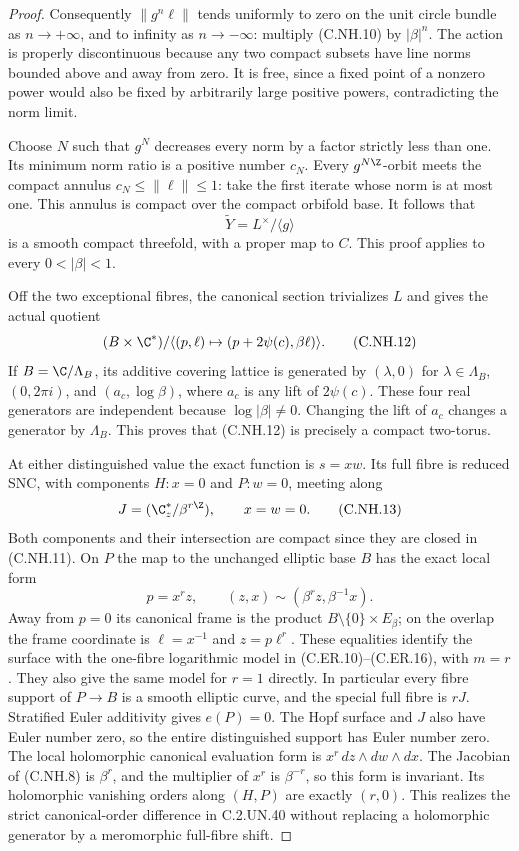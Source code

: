 \begin{proof}
Consequently $\|g^n\ell\|$ tends uniformly to zero on the
unit circle bundle as $n\to+\infty$, and to infinity as
$n\to-\infty$: multiply (C.NH.10) by $|\beta|^n$.
The action is properly discontinuous because any two
compact subsets have line norms bounded above and away
from zero. It is free, since a fixed point of a nonzero
power would also be fixed by arbitrarily large positive
powers, contradicting the norm limit.

Choose $N$ such that $g^N$ decreases every norm by a factor
strictly less than one. Its minimum norm ratio is a positive
number $c_N$. Every $g^{N\Z}$-orbit meets the compact annulus
$c_N\le\|\ell\|\le1$: take the first iterate whose norm is
at most one. This annulus is compact over the compact
orbifold base. It follows that
\[
                 \widetilde Y=L^\times/\langle g\rangle
                                                        \tag{C.NH.11}
\]
is a smooth compact threefold, with a proper map to $C$.
This proof applies to every $0<|\beta|<1$.

Off the two exceptional fibres, the canonical section
trivializes $L$ and gives the actual quotient
\[
 (B\times\C^*)/
   \langle(p,\ell)\mapsto(p+2\psi(c),\beta\ell)\rangle.
                                                        \tag{C.NH.12}
\]
If $B=\C/\Lambda_B$, its additive covering lattice is
generated by $(\lambda,0)$ for $\lambda\in\Lambda_B$,
$(0,2\pi i)$, and $(a_c,\log\beta)$, where $a_c$ is any
lift of $2\psi(c)$. These four real generators are
independent because $\log|\beta|\ne0$. Changing the lift
of $a_c$ changes a generator by $\Lambda_B$. This proves
that (C.NH.12) is precisely a compact two-torus.

At either distinguished value the exact function is
$s=xw$. Its full fibre is reduced SNC, with components
$H:x=0$ and $P:w=0$, meeting along
\[
          J=(\C^*_z/\beta^{r\Z}),\qquad x=w=0.
                                                        \tag{C.NH.13}
\]
Both components and their intersection are compact since
they are closed in (C.NH.11). On $P$ the map to the
unchanged elliptic base $B$ has the exact local form
\[
  p=x^r z,\qquad (z,x)\sim(\beta^r z,\beta^{-1}x).
                                                        \tag{C.NH.14}
\]
Away from $p=0$ its canonical frame is the product
$B\setminus\{0\}\times E_\beta$; on the overlap the
frame coordinate is $\ell=x^{-1}$ and $z=p\ell^r$.
These equalities identify the surface with the one-fibre
logarithmic model in (C.ER.10)--(C.ER.16), with $m=r$.
They also give the same model for $r=1$ directly.
In particular every fibre support of $P\to B$ is a
smooth elliptic curve, and the special full fibre is
$rJ$. Stratified Euler additivity gives $e(P)=0$.
The Hopf surface and $J$ also have Euler number zero,
so the entire distinguished support has Euler number zero.
The local holomorphic canonical evaluation form is
$x^r\,dz\wedge dw\wedge dx$. The Jacobian of (C.NH.8)
is $\beta^r$, and the multiplier of $x^r$ is $\beta^{-r}$,
so this form is invariant. Its holomorphic vanishing orders
along $(H,P)$ are exactly $(r,0)$. This realizes the
strict canonical-order difference in C.2.UN.40 without
replacing a holomorphic generator by a meromorphic
full-fibre shift.


\end{proof}
